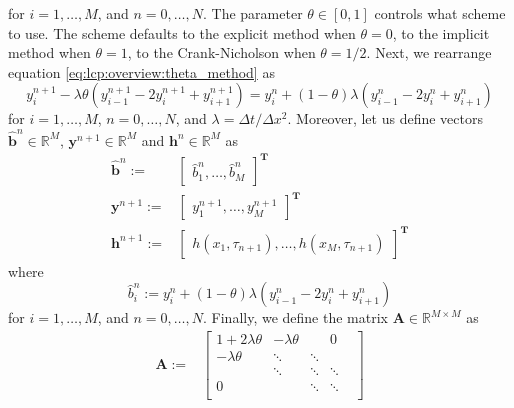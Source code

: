 for $i = 1,\dots,M$, and $n = 0,\dots,N$. The parameter $\theta\in[0,1]$ controls what scheme to use. The scheme defaults to the explicit method when $\theta=0$, to the implicit method when $\theta=1$, to the Crank-Nicholson when $\theta=1/2$. Next, we rearrange equation \eqref{eq:lcp:overview:theta_method} as
\begin{equation}
  \label{eq:lcp:thetamethod:finitedifference_approximation_2}
  y^{n+1}_{i} - \lambda\theta(y^{n+1}_{i-1} - 2y^{n+1}_{i} + y^{n+1}_{i+1}) =  y^{n}_{i} + (1-\theta)\lambda(y^{n}_{i-1} - 2y^{n}_{i} + y^{n}_{i+1})
\end{equation}
for $i = 1,\dots,M$, $n = 0,\dots,N$, and $\lambda=\Delta{t}/\Delta{x}^2$. Moreover, let us define vectors $\hat{\mathbf{b}}^n\in\mathbb{R}^{M}$, $\mathbf{y}^{n+1}\in\mathbb{R}^{M}$ and $\mathbf{h}^n\in\mathbb{R}^{M}$ as
\begin{align}
  \label{eq:lcp:thetamethod:b_hat}
  \hat{\mathbf{b}}^{n} :=& \begin{bmatrix}
    \hat{b}^{n}_1, \dots, \hat{b}^{n}_{M}
  \end{bmatrix}^{\textbf{T}}\\
  \mathbf{y}^{n+1} :=& \begin{bmatrix}
    y^{n+1}_1, \dots, y^{n+1}_{M}
  \end{bmatrix}^{\textbf{T}}\\
  \label{eq:lcp:thetamethod:h_vector}
  \mathbf{h}^{n+1} :=& \begin{bmatrix}
    h(x_1, \tau_{n+1}), \dots, h(x_M, \tau_{n+1})
  \end{bmatrix}^{\textbf{T}}
\end{align}
where 
\begin{equation}
  \hat{b}^{n}_i := y^{n}_{i} + (1-\theta)\lambda(y^{n}_{i-1} - 2y^{n}_{i} + y^{n}_{i+1})
\end{equation}
for $i = 1,\dots,M$, and $n = 0,\dots,N$. Finally, we define the matrix $\mathbf{A}\in\mathbb{R}^{M \times M}$ as
\begin{align}
  \label{eq:lcp:overview:theta_matrix}
  \mathbf{A} :=& \begin{bmatrix}
    1+2\lambda\theta & -\lambda\theta & & 0 \\ 
   -\lambda\theta & \ddots & \ddots \\
      & \ddots & \ddots & \ddots \\
    0 & & \ddots & \ddots & \\
  \end{bmatrix} 
\end{align}
